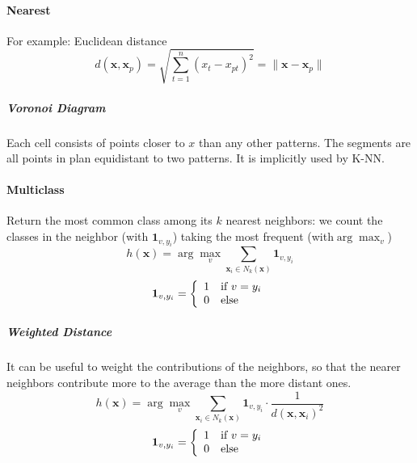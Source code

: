 \documentclass[10pt]{report}
\begin{document}
\paragraph{Nearest} For example: Euclidean distance
$$d(\mathbf{x},\mathbf{x}_p)=\sqrt{\sum_{t=1}^n(x_t-x_{pt})^2}=\|\mathbf{x}-\mathbf{x}_p\|$$
\subparagraph{Voronoi Diagram} Each cell consists of points closer to $x$ than any other patterns. The segments are all points in plan equidistant to two patterns. It is implicitly used by K-NN.
\paragraph{Multiclass} Return the most common class among its $k$ nearest neighbors: we count the classes in the neighbor (with $\mathbf{1}_{v,y_i}$) taking the most frequent (with$\arg\max_v$)
$$h(\mathbf{x})=\arg\max_v\sum_{\mathbf{x}_i\in N_k(\mathbf{x})}\mathbf{1}_{v,y_i}$$
$$\mathbf{1}_{v, y_i}=\left\{\begin{array}{c l}
1&\text{if }v = y_i\\
0&\text{else}
\end{array}\right.$$
\subparagraph{Weighted Distance} It can be useful to weight the contributions of the neighbors, so that the nearer neighbors contribute more to the average than the more distant ones.
$$h(\mathbf{x})=\arg\max_v\sum_{\mathbf{x}_i\in N_k(\mathbf{x})}\mathbf{1}_{v,y_i}\cdot\frac{1}{d(\mathbf{x},\mathbf{x}_i)^2}$$
$$\mathbf{1}_{v, y_i}=\left\{\begin{array}{c l}
1&\text{if }v = y_i\\
0&\text{else}
\end{array}\right.$$
\end{document}
